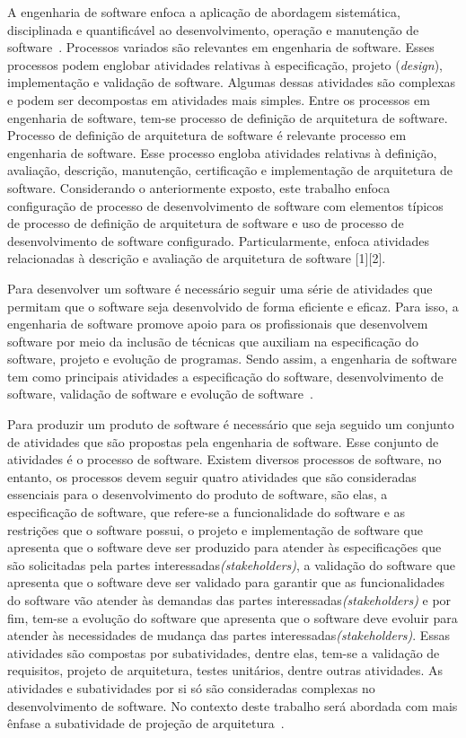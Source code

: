 A engenharia de software enfoca a aplicação de abordagem sistemática, disciplinada e quantificável ao desenvolvimento, operação e manutenção de software~\cite{Swebok}. Processos variados são relevantes em engenharia de software. Esses processos podem englobar atividades relativas à especificação, projeto (\emph{design}), implementação e validação de software. Algumas dessas atividades são complexas e podem ser decompostas em atividades mais simples. Entre os processos em engenharia de software, tem-se processo de definição de arquitetura de software. Processo de definição de arquitetura de software é relevante processo em engenharia de software. Esse processo engloba atividades relativas à definição, avaliação, descrição, manutenção, certificação e implementação de arquitetura de software. Considerando o anteriormente exposto, este trabalho enfoca configuração de processo de desenvolvimento de software com elementos típicos de processo de definição de arquitetura de software e uso de processo de desenvolvimento de software configurado. Particularmente, enfoca atividades relacionadas à descrição e avaliação de arquitetura de software [1][2].


Para desenvolver um software é necessário seguir uma série de atividades que permitam que o software seja desenvolvido de forma eficiente e eficaz. Para isso, a engenharia de software promove apoio para os profissionais que desenvolvem software por meio da inclusão de técnicas que auxiliam na especificação do software, projeto e evolução de programas. Sendo assim, a engenharia de software tem como principais atividades a especificação do software, desenvolvimento de software, validação de software e evolução de software~\cite{Sommerville_2011_texbook}. 

Para produzir um produto de software é necessário que seja seguido um conjunto de atividades que são propostas pela engenharia de software. Esse conjunto de atividades é o processo de software. Existem diversos processos de software, no entanto, os processos devem seguir quatro atividades que são consideradas essenciais para o desenvolvimento do produto de software, são elas, a especificação de software, que refere-se a funcionalidade do software e as restrições que o software possui, o projeto e implementação de software que apresenta que o software deve ser produzido para atender às especificações que são solicitadas pela partes interessadas\emph{(stakeholders)}, a validação do software que apresenta que o software deve ser validado para garantir que as funcionalidades do software vão atender às demandas das partes interessadas\emph{(stakeholders)} e por fim, tem-se a evolução do software que apresenta que o software deve evoluir para atender às necessidades de mudança das partes interessadas\emph{(stakeholders)}. Essas atividades são compostas por subatividades, dentre elas, tem-se a validação de requisitos, projeto de arquitetura, testes unitários, dentre outras atividades. As atividades e subatividades por si só são consideradas complexas no desenvolvimento de software. No contexto deste trabalho será abordada com mais ênfase a subatividade de projeção de arquitetura~\cite{Sommerville_2011_texbook}.

